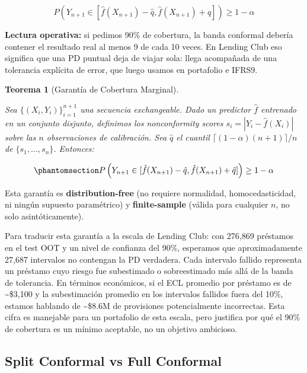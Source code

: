 \documentclass[
  spanish,
  11pt,
  letterpaper,
]{scrbook}
\theoremstyle{plain}
\newtheorem{theorem}{Teorema}[chapter]
\theoremstyle{remark}
\begin{document}
\[
P\left(Y_{n+1} \in [\hat{f}(X_{n+1})-\hat{q},\hat{f}(X_{n+1})+\hat{q}]\right)\geq 1-\alpha
\]

\textbf{Lectura operativa:} si pedimos 90\% de cobertura, la banda
conformal debería contener el resultado real al menos 9 de cada 10
veces. En Lending Club eso significa que una PD puntual deja de viajar
sola: llega acompañada de una tolerancia explícita de error, que luego
usamos en portafolio e IFRS9.

\begin{theorem}[Garantía de Cobertura
Marginal]\protect\hypertarget{thm-coverage}{}\label{thm-coverage}

Sea \(\{(X_i, Y_i)\}_{i=1}^{n+1}\) una secuencia exchangeable. Dado un
predictor \(\hat{f}\) entrenado en un conjunto disjunto, definimos los
nonconformity scores \(s_i = |Y_i - \hat{f}(X_i)|\) sobre las \(n\)
observaciones de calibración. Sea \(\hat{q}\) el cuantil
\(\lceil(1-\alpha)(n+1)\rceil / n\) de \(\{s_1, \ldots, s_n\}\).
Entonces:

\begin{equation}\protect\phantomsection\label{eq-coverage-guarantee}{
P\left(Y_{n+1} \in [\hat{f}(X_{n+1}) - \hat{q}, \hat{f}(X_{n+1}) + \hat{q}]\right) \geq 1 - \alpha
}\end{equation}

\end{theorem}

Esta garantía es \textbf{distribution-free} (no requiere normalidad,
homocedasticidad, ni ningún supuesto paramétrico) y
\textbf{finite-sample} (válida para cualquier \(n\), no solo
asintóticamente).

Para traducir esta garantía a la escala de Lending Club: con 276,869
préstamos en el test OOT y un nivel de confianza del 90\%, esperamos que
aproximadamente 27,687 intervalos no contengan la PD verdadera. Cada
intervalo fallido representa un préstamo cuyo riesgo fue subestimado o
sobreestimado más allá de la banda de tolerancia. En términos
económicos, si el ECL promedio por préstamo es de \textasciitilde\$3,100
y la subestimación promedio en los intervalos fallidos fuera del 10\%,
estamos hablando de \textasciitilde\$8.6M de provisiones potencialmente
incorrectas. Esta cifra es manejable para un portafolio de esta escala,
pero justifica por qué el 90\% de cobertura es un mínimo aceptable, no
un objetivo ambicioso.

\subsection{Split Conformal vs Full
Conformal}\label{split-conformal-vs-full-conformal}
\end{document}
